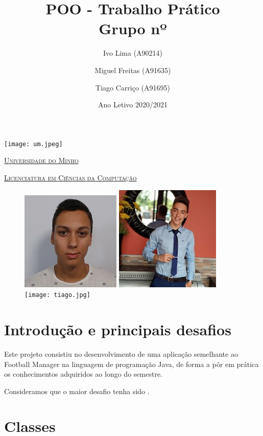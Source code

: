 \documentclass[a4paper]{report}
\title{POO - Trabalho Prático\\
	\large Grupo nº}
\author{Ivo Lima (A90214)
	\and Miguel Freitas (A91635)
	\and Tiago Carriço (A91695)}
\date{Ano Letivo 2020/2021}
\begin{document}
	\begin{minipage}{0.9\linewidth}
        \centering
		\texttt{[image: um.jpeg]}\par\vspace{1cm}
		\href{https://www.uminho.pt/PT}
		{\scshape\LARGE Universidade do Minho} \par
		\vspace{0.6cm}
		\href{https://lcc.di.uminho.pt}
		{\scshape\Large Licenciatura em Ciências da Computação} \par
		\maketitle
		\begin{figure}[H]
			\includegraphics[width=0.32\linewidth]{ivo.jpg}
			\includegraphics[width=0.32\linewidth]{miguel.jpg}
			\texttt{[image: tiago.jpg]}
		\end{figure}
	\end{minipage}
	
	\tableofcontents
	
	\pagebreak
	
	\chapter{Introdução e principais desafios}
%	
	Este projeto consistiu no desenvolvimento de uma aplicação semelhante ao Football Manager na linguagem de programação Java, de forma a pôr em prática os conhecimentos adquiridos ao longo do semestre. 
	
	Consideramos que o maior desafio tenha sido .
	
	\chapter{Classes}
\end{document}
